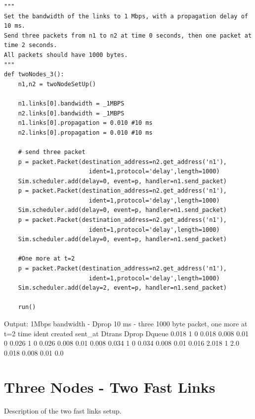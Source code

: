 \documentclass[11pt]{article}
\begin{document}
\begin{lstlisting}
"""
Set the bandwidth of the links to 1 Mbps, with a propagation delay of 10 ms. 
Send three packets from n1 to n2 at time 0 seconds, then one packet at time 2 seconds. 
All packets should have 1000 bytes.
"""
def twoNodes_3():
    n1,n2 = twoNodeSetUp()

    n1.links[0].bandwidth = _1MBPS
    n2.links[0].bandwidth = _1MBPS
    n1.links[0].propagation = 0.010 #10 ms
    n2.links[0].propagation = 0.010 #10 ms

    # send three packet
    p = packet.Packet(destination_address=n2.get_address('n1'),
                        ident=1,protocol='delay',length=1000)
    Sim.scheduler.add(delay=0, event=p, handler=n1.send_packet)
    p = packet.Packet(destination_address=n2.get_address('n1'),
                        ident=1,protocol='delay',length=1000)
    Sim.scheduler.add(delay=0, event=p, handler=n1.send_packet)
    p = packet.Packet(destination_address=n2.get_address('n1'),
                        ident=1,protocol='delay',length=1000)
    Sim.scheduler.add(delay=0, event=p, handler=n1.send_packet)

    #One more at t=2
    p = packet.Packet(destination_address=n2.get_address('n1'),
                        ident=1,protocol='delay',length=1000)
    Sim.scheduler.add(delay=2, event=p, handler=n1.send_packet)

    run()
\end{lstlisting}
Output:
1Mbps bandwidth - Dprop 10 ms - three 1000 byte packet, one more at t=2
time    ident   created sent_at Dtrans  Dprop   Dqueue  
0.018   1       0       0.018   0.008   0.01    0
0.026   1       0       0.026   0.008   0.01    0.008
0.034   1       0       0.034   0.008   0.01    0.016
2.018   1       2.0     0.018   0.008   0.01    0.0


\section{Three Nodes - Two Fast Links}

Description of the two fast links setup. 
\end{document}

